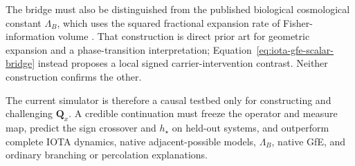 The bridge must also be distinguished from the published biological
cosmological constant $\Lambda_B$, which uses the squared fractional expansion
rate of Fisher-information volume \cite{farina2026lambdaB}. That construction is
direct prior art for geometric expansion and a phase-transition interpretation;
Equation~\ref{eq:iota-gfe-scalar-bridge} instead proposes a local signed
carrier-intervention contrast. Neither construction confirms the other.

The current simulator is therefore a causal testbed only for constructing and
challenging $\mathbf Q_x$. A credible continuation must freeze the operator and
measure map, predict the sign crossover and $h_\star$ on held-out systems, and
outperform complete IOTA dynamics, native adjacent-possible models,
$\Lambda_B$, native GfE, and ordinary branching or percolation explanations.
